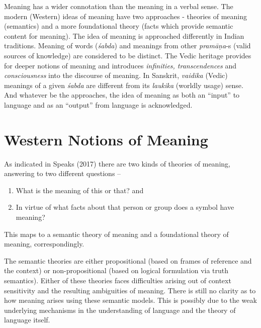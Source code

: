 Meaning has a wider connotation than the meaning in a verbal sense. The modern (Western) ideas of meaning have two approaches - theories of meaning (semantics) and a more foundational theory (facts which provide semantic content for meaning). The idea of meaning is approached differently in Indian traditions. Meaning of words (\textit{śabda}) and meanings from other \textit{pramāṇa}-s (valid sources of knowledge) are considered to be distinct. The Vedic heritage provides for deeper notions of meaning and introduces \textit{infinities, transcendences} and \textit{consciousness} into the discourse of meaning. In Sanskrit, \textit{vaidika} (Vedic) meanings of a given \textit{śabda} are different from its \textit{laukika} (worldly usage) sense. And whatever be the approaches, the idea of meaning as both an “input” to language and as an “output” from language is acknowledged.


\section*{Western Notions of Meaning}

\vskip -5pt

As indicated in Speaks (2017) there are two kinds of theories of meaning, answering to two different questions –

\begin{enumerate}
\itemsep=0pt
\item What is the meaning of this or that? and

 \item In virtue of what facts about that person or group does a symbol have meaning?

\end{enumerate}

This maps to a semantic theory of meaning and a foundational theory of meaning, correspondingly.

The semantic theories are either propositional (based on frames of reference and the context) or non-propositional (based on logical formulation via truth semantics). Either of these theories faces difficulties arising out of context sensitivity and the resulting ambiguities of meaning. There is still no clarity as to how meaning arises using these semantic models. This is possibly due to the weak underlying mechanisms in the understanding of language and the theory of language itself.

